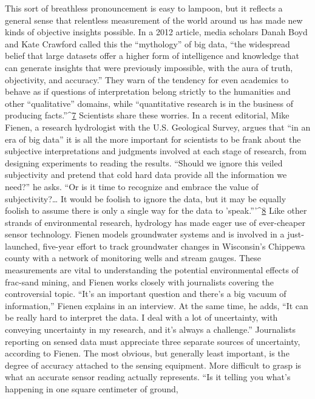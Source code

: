 This sort of breathless pronouncement is easy to lampoon, but it reflects a
general sense that relentless measurement of the world around us has made
new kinds of objective insights possible. In a 2012 article, media scholars
Danah Boyd and Kate Crawford called this the ``mythology'' of big data, ``the
widespread belief that large datasets offer a higher form of intelligence and
knowledge that can generate insights that were previously impossible, with
the aura of truth, objectivity, and accuracy.'' They warn of the tendency for
even academics to behave as if questions of interpretation belong strictly to
the humanities and other ``qualitative'' domains, while ``quantitative research
is in the business of producing facts.''^{\href{#endnotes-graves}{7}}
Scientists share these worries. In a recent editorial, Mike Fienen, a research
hydrologist with the U.S. Geological Survey, argues that ``in an era of big
data'' it is all the more important for scientists to be frank about the subjective
interpretations and judgments involved at each stage of research, from
designing experiments to reading the results. ``Should we ignore this veiled
subjectivity and pretend that cold hard data provide all the information we
need?'' he asks. ``Or is it time to recognize and embrace the value of subjectivity?…
It would be foolish to ignore the data, but it may be equally foolish
to assume there is only a single way for the data to 'speak.'''^{\href{#endnotes-graves}{8}}
Like other strands of environmental research, hydrology has made eager
use of ever-cheaper sensor technology. Fienen models groundwater systems
and is involved in a just-launched, five-year effort to track groundwater
changes in Wisconsin's Chippewa county with a network of monitoring
wells and stream gauges. These measurements are vital to understanding
the potential environmental effects of frac-sand mining, and Fienen works
closely with journalists covering the controversial topic. ``It's an important
question and there's a big vacuum of information,'' Fienen explains in an interview. At the same time, he adds, ``It can be really hard to interpret
the data. I deal with a lot of uncertainty, with conveying uncertainty in my
research, and it's always a challenge.''
Journalists reporting on sensed data must appreciate three separate sources
of uncertainty, according to Fienen. The most obvious, but generally least
important, is the degree of accuracy attached to the sensing equipment.
More difficult to grasp is what an accurate sensor reading actually represents.
``Is it telling you what's happening in one square centimeter of ground,
